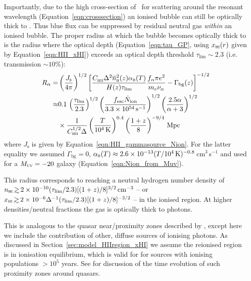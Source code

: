 \documentclass[fleqn,usenatbib]{mnras}
\begin{document}
Importantly, due to the high cross-section of \lya\ for scattering around the resonant wavelength (Equation~\eqref{eqn:crosssection}) an ionised bubble can still be optically thick to \lya. Thus blue \lya flux can be suppressed by residual neutral gas \textit{within} an ionised bubble. The proper radius at which the bubble becomes optically thick to \lya is the radius where the \citet{Gunn1965} optical depth (Equation~\eqref{eqn:tau_GP}, using $\xHI(r)$ given by Equation~\ref{eqn:HII_xHI}) exceeds an optical depth threshold $\tau_\mathrm{lim}\sim 2.3$ (i.e. transmission $\sim10$\%):
%
\begin{align} \label{eqn:opticallythin}
%
R_\alpha =& \left(\frac{J_\mathrm{s}}{4\pi}\right)^{1/2} \left[ \frac{ \clump \Delta^2 \nh[2](z) \alpha_\textsc{b}(T)}{H(z) \tau_\mathrm{lim}}\frac{f_\alpha \pi e^2}{m_e \nu_\alpha} - \Gamma_\textrm{bg}(z) \right]^{-1/2} \\
%
\approx& 0.1 \, \left(\frac{\tau_\mathrm{lim}}{2.3}\right)^{1/2} \left(\frac{\fesc\Nion}{3.3 \times 10^{54}\,\mathrm{s}^{-1}}\right)^{1/2}  \left(\frac{2.5\alpha}{\alpha+3}\right)^{1/2} \nonumber \\
&\times \frac{1}{C_\textsc{hii}^{1/2}\Delta} \left(\frac{T}{10^4\,\mathrm{K}}\right)^{0.4} \left(\frac{1+z}{8}\right)^{-9/4} \,\mathrm{Mpc} \nonumber
%
\end{align}
%
where $J_\mathrm{s}$ is given by Equation~\eqref{eqn:HII_gammasource_Nion}.
For the latter equality we assumed $\Gamma_\mathrm{bg} = 0$, $\alpha_\textsc{b}(T) \approx 2.6\times10^{-13}(T/10^4\,\mathrm{K})^{-0.8}$\,cm$^3$\,s$^{-1}$ and used \Nion for a $\MUV = -20$ galaxy (Equation~\ref{eqn:Nion_from_Muv}).

This radius corresponds to reaching a neutral hydrogen number density of $n_\HI \simgt 2\times10^{-10} (\tau_\mathrm{lim}/2.3)[(1+z)/8]^{3/2}\cm^{-3}$ -- or $\xHI \simgt 2\times10^{-6} \Delta^{-1} (\tau_\mathrm{lim}/2.3)[(1+z)/8]^{-3/2}$ -- in the ionised region. At higher densities/neutral fractions the gas is optically thick to \lya photons.

This is analogous to the quasar near/proximity zones described by \citet{bolton2007c}, except here we include the contribution of other, diffuse sources of ionising photons. As discussed in Section~\ref{sec:model_HIIregion_xHI} we assume the reionised region is in ionisation equilibrium, which is valid for for sources with ionising populations $>10^5$ years. See \citet{Davies2019} for discussion of the time evolution of such proximity zones around quasars.
\end{document}
